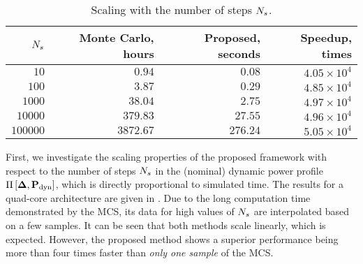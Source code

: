 \begin{table}
  \centering
  \caption{Scaling with the number of steps ${N_s}$.}
  \vspace{-10pt}
  \begin{tabular}{|r|r|r|r|}
    \hline
    ${N_s}$ & Monte Carlo, hours & Proposed, seconds & Speedup, times \\
    \hline
    $     10$ & $   0.94$ & $  0.08$ & $4.05 \times 10^4$ \\
    $    100$ & $   3.87$ & $  0.29$ & $4.85 \times 10^4$ \\
    $   1000$ & $  38.04$ & $  2.75$ & $4.97 \times 10^4$ \\
    $  10000$ & $ 379.83$ & $ 27.55$ & $4.96 \times 10^4$ \\
    $ 100000$ & $3872.67$ & $276.24$ & $5.05 \times 10^4$ \\
    \hline
  \end{tabular}
  \vspace{-10pt}
\end{table}
First, we investigate the scaling properties of the proposed framework with respect to the number of steps ${N_s}$ in the (nominal) dynamic power profile $\prof{\mP_\dyn}$, which is directly proportional to simulated time. The results for a quad-core architecture are given in . Due to the long computation time demonstrated by the MCS, its data for high values of ${N_s}$ are interpolated based on a few samples. It can be seen that both methods scale linearly, which is expected. However, the proposed method shows a superior performance being more than four times faster than \emph{only one sample} of the MCS.

